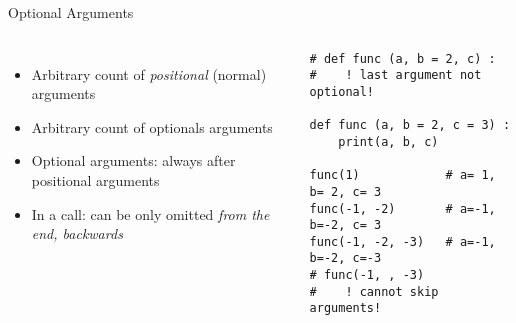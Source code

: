 \begin{frame}[fragile]{Optional Arguments}
%
\begin{columns}[T]
\begin{itemize}
\item Arbitrary count of \emph{positional} (normal) arguments
\item Arbitrary count of optionals arguments
\item Optional arguments: always after positional arguments
\item In a call: can be only omitted \emph{from the end, backwards}
\end{itemize}
%
\begin{codebox}
\begin{verbatim}
# def func (a, b = 2, c) :
#    ! last argument not optional!

def func (a, b = 2, c = 3) :
    print(a, b, c)
    
func(1)            # a= 1, b= 2, c= 3
func(-1, -2)       # a=-1, b=-2, c= 3
func(-1, -2, -3)   # a=-1, b=-2, c=-3
# func(-1, , -3)
#    ! cannot skip arguments!
\end{verbatim}
\end{codebox}
\end{columns}
%
\end{frame}



